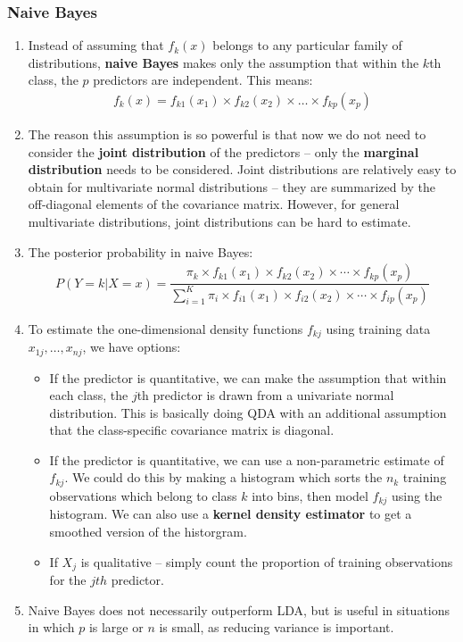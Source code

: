 \documentclass[10pt]{article}
\begin{document}
\subsubsection{Naive Bayes} 
\begin{enumerate}
	\item Instead of assuming that $f_k(x)$ belongs to any particular family of distributions, \textbf{naive Bayes} makes only the assumption that within the $k$th class, the $p$ predictors are independent.  This means:
	\begin{align*}
		f_k(x) = f_{k1}(x_1) \times f_{k2}(x_2) \times \dots \times f_{kp}(x_p) 
	\end{align*}
	\item The reason this assumption is so powerful is that now we do not need to consider the \textbf{joint distribution} of the predictors -- only the \textbf{marginal distribution} needs to be considered.  Joint distributions are relatively easy to obtain for multivariate normal distributions -- they are summarized by the off-diagonal elements of the covariance matrix.  However, for general multivariate distributions, joint distributions can be hard to estimate.  
	\item The posterior probability in naive Bayes:
	\begin{align*}
		P(Y = k| X = x) = \dfrac{\pi_k \times f_{k1}(x_1) \times f_{k2}(x_2) \times \cdots \times f_{kp}(x_p)}{\sum_{i = 1}^K \pi_i \times f_{i1}(x_1) \times f_{i2}(x_2) \times \cdots \times f_{ip}(x_p)}
	\end{align*}
	\item To estimate the one-dimensional density functions $f_{kj}$ using training data $x_{1j}, \dots, x_{nj}$, we have options: \begin{itemize}
		\item If the predictor is quantitative, we can make the assumption that within each class, the $j$th predictor is drawn from a univariate normal distribution.  This is basically doing QDA with an additional assumption that the class-specific covariance matrix is diagonal.	
		\item If the predictor is quantitative, we can use a non-parametric estimate of $f_{kj}$.  We could do this by making a histogram which sorts the $n_k$ training observations which belong to class $k$ into bins, then model $f_{kj}$ using the histogram.  We can also use a \textbf{kernel density estimator} to get a smoothed version of the historgram. 
		\item If $X_j$ is qualitative -- simply count the proportion of training observations for the $jth$ predictor.
	\end{itemize}
	\item Naive Bayes does not necessarily outperform LDA, but is useful in situations in which $p$ is large or $n$ is small, as reducing variance is important.
\end{enumerate}
\end{document}
